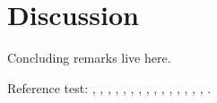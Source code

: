 \section{Discussion}
\label{sec:discussion}

Concluding remarks live here.

Reference test:
\cite{ArcherWest2003},
\cite{BarrettJolleyetal2010},
\cite{Chaetal2009},
\cite{Chuetal2006},
\cite{Clarketal2011},
\cite{Halletal1996},
\cite{HorriganAldrich2002},
\cite{LesageLazdunski2000},
\cite{Lewisetal2011},
\cite{Maleckaretal2009},
\cite{Nygrenetal1998},
\cite{RadhakrishnanHindmarsh1993},
\cite{Scholz2002},
\cite{Sugimotoetal1996},
\cite{Tsugaetal2001},
\cite{UNKNOWN}.

